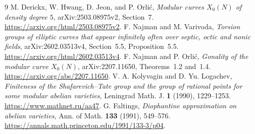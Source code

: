 \documentclass[11pt,a4paper]{article}
\begin{document}
\begin{thebibliography}{9}
M. Derickx, W. Hwang, D. Jeon, and P. Orli\'c,
\emph{Modular curves $X_0(N)$ of density degree $5$},
arXiv:2503.08975v2, Section~7.
\url{https://arxiv.org/html/2503.08975v2}.
F. Najman and M. Varivoda,
\emph{Torsion groups of elliptic curves that appear infinitely often
over septic, octic and nonic fields},
arXiv:2602.03513v4, Section~5.5, Proposition~5.5.
\url{https://arxiv.org/html/2602.03513v4}.
F. Najman and P. Orli\'c,
\emph{Gonality of the modular curve $X_0(N)$},
arXiv:2207.11650, Theorems~1.2 and~1.4.
\url{https://arxiv.org/abs/2207.11650}.
V. A. Kolyvagin and D. Yu. Logachev,
\emph{Finiteness of the Shafarevich--Tate group and the group of
rational points for some modular abelian varieties},
Leningrad Math. J. \textbf{1} (1990), 1229--1253.
\url{https://www.mathnet.ru/aa47}.
G. Faltings, \emph{Diophantine approximation on abelian varieties},
Ann. of Math. \textbf{133} (1991), 549--576.
\url{https://annals.math.princeton.edu/1991/133-3/p04}.
\end{thebibliography}
\end{document}
